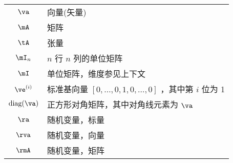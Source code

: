 \begin{minipage}{\textwidth}
\begin{tabular}{cp{3.25in}}
$\displaystyle \va$ & 向量(矢量)\\
$\displaystyle \mA$ & 矩阵\\
$\displaystyle \tA$ & 张量\\
$\displaystyle \mI_n$ &  $n$ 行 $n$ 列的单位矩阵\\
$\displaystyle \mI$ & 单位矩阵，维度参见上下文\\
$\displaystyle \ve^{(i)}$ & 标准基向量 $[0,\dots,0,1,0,\dots,0]$ ，其中第 $i$ 位为 1\\
$\displaystyle \text{diag}(\va)$ & 正方形对角矩阵，其中对角线元素为 $\va$ \\
$\displaystyle \ra$ & 随机变量，标量\\
$\displaystyle \rva$ & 随机变量，向量\\
$\displaystyle \rmA$ & 随机变量，矩阵\\
\end{tabular}
\egroup
{}
\end{minipage}

